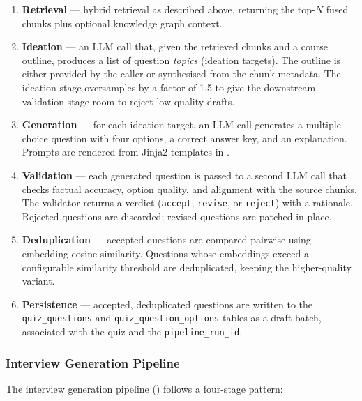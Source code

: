 \begin{enumerate}
    \item \textbf{Retrieval} — hybrid retrieval as described above, returning the top-$N$ fused chunks plus optional knowledge graph context.
    \item \textbf{Ideation} — an LLM call that, given the retrieved chunks and a course outline, produces a list of question \emph{topics} (ideation targets). The outline is either provided by the caller or synthesised from the chunk metadata. The ideation stage oversamples by a factor of 1.5 to give the downstream validation stage room to reject low-quality drafts.
    \item \textbf{Generation} — for each ideation target, an LLM call generates a multiple-choice question with four options, a correct answer key, and an explanation. Prompts are rendered from Jinja2 templates in .
    \item \textbf{Validation} — each generated question is passed to a second LLM call that checks factual accuracy, option quality, and alignment with the source chunks. The validator returns a verdict (\texttt{accept}, \texttt{revise}, or \texttt{reject}) with a rationale. Rejected questions are discarded; revised questions are patched in place.
    \item \textbf{Deduplication} — accepted questions are compared pairwise using embedding cosine similarity. Questions whose embeddings exceed a configurable similarity threshold are deduplicated, keeping the higher-quality variant.
    \item \textbf{Persistence} — accepted, deduplicated questions are written to the \texttt{quiz\_questions} and \texttt{quiz\_question\_options} tables as a draft batch, associated with the quiz and the \texttt{pipeline\_run\_id}.
\end{enumerate}

\subsubsection{Interview Generation Pipeline}
\label{sec:impl_interview_pipeline}

The interview generation pipeline () follows a four-stage pattern:

